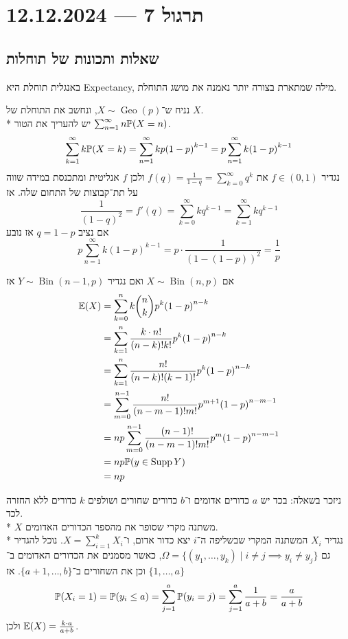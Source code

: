 \section{תרגול 7 --- 12.12.2024}
\subsection{שאלות ותכונות של תוחלות}
באנגלית תוחלת היא Expectancy, מילה שמתארת בצורה יותר נאמנה את מושג התוחלת.
\begin{example}
	נניח ש־$X \sim \operatorname{Geo}(p)$, ונחשב את התוחלת של $X$. \\*
	יש להעריך את הטור $\sum_{n = 1}^\infty n \mathbb{P}(X = n)$.
	\[
		\sum_{k = 1}^\infty k \mathbb{P}(X = k)
		= \sum_{n = 1}^\infty k p {(1 - p)}^{k - 1}
		= p \sum_{n = 1}^\infty k {(1 - p)}^{k - 1}
	\]
	נגדיר $f \in (0, 1)$ את $f(q) = \frac{1}{1 - q} = \sum_{k = 0}^{\infty} q^k$ ולכן $f$ אנליטית ומתכנסת במידה שווה על תת־קבוצות של התחום שלה.
	אז
	\[
		\frac{1}{{(1 - q)}^2}
		= f'(q)
		= \sum_{k = 0}^{\infty} k q^{k - 1}
		= \sum_{k = 1}^{\infty} k q^{k - 1}
	\]
	אם נציב $q = 1 - p$ אז נובע
	\[
		p \sum_{n = 1}^\infty k {(1 - p)}^{k - 1}
		= p \cdot \frac{1}{{(1 - (1 - p))}^2}
		= \frac{1}{p}
	\]
\end{example}
\begin{example}
	אם $X \sim \operatorname{Bin}(n, p)$ ואם נגדיר $Y \sim \operatorname{Bin}(n - 1, p)$ אז
	\begin{align*}
		\mathbb{E}(X)
		& = \sum_{k = 0}^{n} k \binom{n}{k} p^k {(1 - p)}^{n - k} \\
		& = \sum_{k = 1}^{n} \frac{k \cdot n!}{(n - k)! k!} p^k {(1 - p)}^{n - k} \\
		& = \sum_{k = 1}^{n} \frac{n!}{(n - k)! (k - 1)!} p^k {(1 - p)}^{n - k} \\
		& = \sum_{m = 0}^{n - 1} \frac{n!}{(n - m - 1)! m!} p^{m + 1} {(1 - p)}^{n - m - 1} \\
		& = n p \sum_{m = 0}^{n - 1} \frac{(n - 1)!}{(n - m - 1)! m!} p^m {(1 - p)}^{n - m - 1} \\
		& = n p \mathbb{P}(y \in \operatorname{Supp} Y) \\
		& = n p
	\end{align*}
\end{example}
\begin{example}
	ניזכר בשאלה: בכד יש $a$ כדורים אדומים ו־$b$ כדורים שחורים ושולפים $k$ כדורים ללא החזרה לכד. \\*
	$X$ משתנה מקרי שסופר את מהספר הכדורים האדומים. \\*
	נגדיר $X_i$ המשתנה המקרי שבשליפה ה־$i$ יצא כדור אדום, ו־$X = \sum_{i = 1}^k X_i$.
	נוכל להגדיר גם $\Omega = \{ (y_1, \dots, y_k) \mid i \ne j \implies y_i \ne y_j \}$, כאשר מסמנים את הכדורים האדומים ב־$\{1, \dots, a\}$ וכן את השחורים ב־$\{a + 1, \dots, b\}$.
	אז
	\[
		\mathbb{P}(X_i = 1)
		= \mathbb{P}(y_i \le a)
		= \sum_{j = 1}^{a} \mathbb{P}(y_i = j)
		= \sum_{j = 1}^{a} \frac{1}{a + b}
		= \frac{a}{a + b}
	\]
	ולכן $\mathbb{E}(X) = \frac{k \cdot a}{a + b}$.
\end{example}

